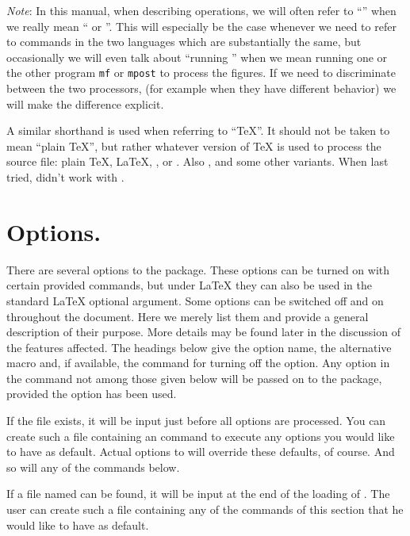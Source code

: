 \documentclass[letterpaper]{article}
\begin{document}
\smallskip
\emph{Note}: In this manual, when describing \mfp{} operations, we will
often refer to ``\MF{}'' when we really mean ``\MF{} or \MP{}''. This
will especially be the case whenever we need to refer to commands in the
two languages which are substantially the same, but occasionally we will
even talk about ``running \MF{}'' when we mean running one or the other
program \texttt{mf} or \texttt{mpost} to process the figures. If we need
to discriminate between the two processors, (for example when they have
different behavior) we will make the difference explicit.

A similar shorthand is used when referring to ``\TeX{}''. It should not be
taken to mean ``plain \TeX{}'', but rather whatever version of \TeX{} is used
to process the source file: plain \TeX{}, \LaTeX{}, \pdfTeX{}, or
\pdfLaTeX{}. Also \AmSTeX{},  and some other variants. When
last tried, \mfp{} didn't work with \ConTeXt{}.

\clearpage
\chapter{Options.}\label{options}

There are several options to the \mfp{} package. These options can be
turned on with certain provided commands, but under \LaTeX{} they can
also be used in the standard \LaTeX{}  optional argument.
Some options can be switched off and on throughout the document. Here we
merely list them and provide a general description of their purpose.
More details may be found later in the discussion of the features
affected. The headings below give the option name, the alternative macro
and, if available, the command for turning off the option. Any option
in the  command not among those given below will be
passed on to the  package, provided the 
option has been used.

If the file  exists, it will be input just before all
options are processed. You can create such a file containing an
 command to execute any options you would like to
have as default. Actual options to  will override these
defaults, of course. And so will any of the commands below.

If a file named  can be found, it will be input at the
end of the loading of \mfp{}. The user can create such a file containing
any of the commands of this section that he would like to have as
default.
\end{document}
